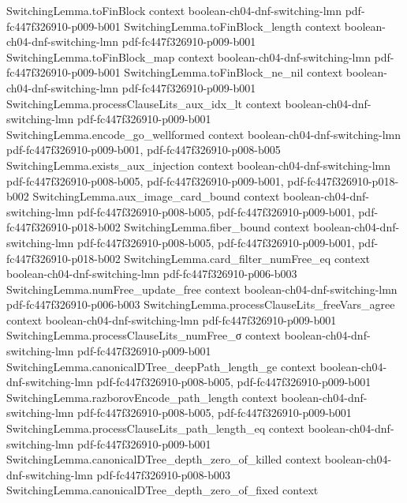 \begin{theorem}
\proofstep
  {SwitchingLemma.toFinBlock}
  {context}
  {boolean-ch04-dnf-switching-lmn}
  {pdf-fc447f326910-p009-b001}
\proofstep
  {SwitchingLemma.toFinBlock_length}
  {context}
  {boolean-ch04-dnf-switching-lmn}
  {pdf-fc447f326910-p009-b001}
\proofstep
  {SwitchingLemma.toFinBlock_map}
  {context}
  {boolean-ch04-dnf-switching-lmn}
  {pdf-fc447f326910-p009-b001}
\proofstep
  {SwitchingLemma.toFinBlock_ne_nil}
  {context}
  {boolean-ch04-dnf-switching-lmn}
  {pdf-fc447f326910-p009-b001}
\proofstep
  {SwitchingLemma.processClauseLits_aux_idx_lt}
  {context}
  {boolean-ch04-dnf-switching-lmn}
  {pdf-fc447f326910-p009-b001}
\proofstep
  {SwitchingLemma.encode_go_wellformed}
  {context}
  {boolean-ch04-dnf-switching-lmn}
  {pdf-fc447f326910-p009-b001,
    pdf-fc447f326910-p008-b005}
\proofstep
  {SwitchingLemma.exists_aux_injection}
  {context}
  {boolean-ch04-dnf-switching-lmn}
  {pdf-fc447f326910-p008-b005,
    pdf-fc447f326910-p009-b001,
    pdf-fc447f326910-p018-b002}
\proofstep
  {SwitchingLemma.aux_image_card_bound}
  {context}
  {boolean-ch04-dnf-switching-lmn}
  {pdf-fc447f326910-p008-b005,
    pdf-fc447f326910-p009-b001,
    pdf-fc447f326910-p018-b002}
\proofstep
  {SwitchingLemma.fiber_bound}
  {context}
  {boolean-ch04-dnf-switching-lmn}
  {pdf-fc447f326910-p008-b005,
    pdf-fc447f326910-p009-b001,
    pdf-fc447f326910-p018-b002}
\proofstep
  {SwitchingLemma.card_filter_numFree_eq}
  {context}
  {boolean-ch04-dnf-switching-lmn}
  {pdf-fc447f326910-p006-b003}
\proofstep
  {SwitchingLemma.numFree_update_free}
  {context}
  {boolean-ch04-dnf-switching-lmn}
  {pdf-fc447f326910-p006-b003}
\proofstep
  {SwitchingLemma.processClauseLits_freeVars_agree}
  {context}
  {boolean-ch04-dnf-switching-lmn}
  {pdf-fc447f326910-p009-b001}
\proofstep
  {SwitchingLemma.processClauseLits_numFree_σ}
  {context}
  {boolean-ch04-dnf-switching-lmn}
  {pdf-fc447f326910-p009-b001}
\proofstep
  {SwitchingLemma.canonicalDTree_deepPath_length_ge}
  {context}
  {boolean-ch04-dnf-switching-lmn}
  {pdf-fc447f326910-p008-b005,
    pdf-fc447f326910-p009-b001}
\proofstep
  {SwitchingLemma.razborovEncode_path_length}
  {context}
  {boolean-ch04-dnf-switching-lmn}
  {pdf-fc447f326910-p008-b005,
    pdf-fc447f326910-p009-b001}
\proofstep
  {SwitchingLemma.processClauseLits_path_length_eq}
  {context}
  {boolean-ch04-dnf-switching-lmn}
  {pdf-fc447f326910-p009-b001}
\proofstep
  {SwitchingLemma.canonicalDTree_depth_zero_of_killed}
  {context}
  {boolean-ch04-dnf-switching-lmn}
  {pdf-fc447f326910-p008-b003}
\proofstep
  {SwitchingLemma.canonicalDTree_depth_zero_of_fixed}
  {context}

\end{theorem}
